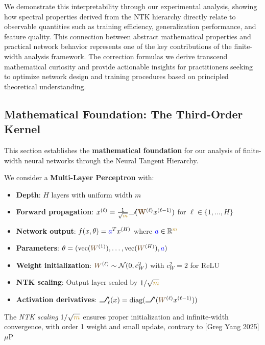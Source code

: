 \documentclass[a4paper]{article}
\newcommand{\W}{\textcolor{weightcolor}{W}}
\DeclareRobustCommand{\ReLU}{\mathrel{\text{%
    \begin{tikzpicture}[baseline=(current bounding box.south)]
        \draw[thick] (0,0) -- (0.25,0) -- (0.4,0.25);
    \end{tikzpicture}}}\!\!}
\theoremstyle{plain}
\theoremstyle{definition}
\theoremstyle{remark}
\begin{document}
We demonstrate this interpretability through our experimental analysis, showing how spectral properties derived from the NTK hierarchy directly relate to observable quantities such as training efficiency, generalization performance, and feature quality. This connection between abstract mathematical properties and practical network behavior represents one of the key contributions of the finite-width analysis framework. The correction formulas we derive transcend mathematical curiosity and provide actionable insights for practitioners seeking to optimize network design and training procedures based on principled theoretical understanding.





\subsection{Mathematical Foundation: The Third-Order Kernel}
This section establishes the \textbf{mathematical foundation} for our analysis of finite-width neural networks through the Neural Tangent Hierarchy.

\begin{tcolorbox}[colback=blue!10,colframe=blue!60!black,title={\textbf{Network Architecture and Initialization}},enhanced,drop shadow]
We consider a \textbf{Multi-Layer Perceptron} with:
\begin{itemize}
\item \textbf{Depth}: $H$ layers with uniform width $m$
\item \textbf{Forward propagation}: $x^{(\ell)} = \frac{1}{\sqrt{\textcolor{darkyellow}{m}}} \textcolor{relucolor}{\ReLU} (\textcolor{weightcolor}{\mathbf{W}}^{(\ell)}x^{(\ell-1)})$ for $\ell \in \{1, \ldots, H\}$
\item \textbf{Network output}: $f(x, \theta) = \textcolor{blue}{a}^T x^{(H)}$ where $\textcolor{blue}{a} \in \mathbb{R}^{\textcolor{darkyellow}{m}}$
\item \textbf{Parameters}: $\theta = (\text{vec}(\W^{(1)}), \ldots, \text{vec}(\W^{(H)}), \textcolor{blue}{a})$
\item \textbf{Weight initialization}: $\W^{(\ell)} \sim \mathcal{N}(0, c_W^2)$ with $c_W^2 = 2$ for ReLU
\item \textbf{NTK scaling}: Output layer scaled by $1/\sqrt{\textcolor{darkyellow}{m}}$
\item \textbf{Activation derivatives}: $\ReLU'_\ell(x) = \text{diag}(\ReLU'(\W^{(\ell)}x^{(\ell-1)}))$
\end{itemize}

The \textit{NTK scaling} $1/\sqrt{\textcolor{darkyellow}{m}}$ ensures proper initialization and infinite-width convergence, with order 1 weight and small update, contrary to [Greg Yang 2025] $\mu$P
\end{tcolorbox}
\end{document}
